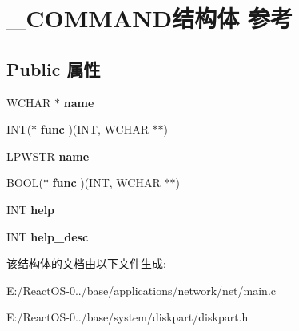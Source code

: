 \hypertarget{struct___c_o_m_m_a_n_d}{}\section{\+\_\+\+C\+O\+M\+M\+A\+N\+D结构体 参考}
\label{struct___c_o_m_m_a_n_d}
\subsection*{Public 属性}
\begin{DoxyCompactItemize}
\item 
\mbox{\label{struct___c_o_m_m_a_n_d_a55d755309c3ec8e34ad5a07dec08bf1c}} 
W\+C\+H\+AR $\ast$ {\bfseries name}
\item 
\mbox{\label{struct___c_o_m_m_a_n_d_a79fbb5a11689ec3cfbdda73522455f4d}} 
I\+NT($\ast$ {\bfseries func} )(I\+NT, W\+C\+H\+AR $\ast$$\ast$)
\item 
\mbox{\label{struct___c_o_m_m_a_n_d_a8540cf847ed07445172a09411f7165b2}} 
L\+P\+W\+S\+TR {\bfseries name}
\item 
\mbox{\label{struct___c_o_m_m_a_n_d_a33c89a07deb7afdcc5748e9ed9181ee5}} 
B\+O\+OL($\ast$ {\bfseries func} )(I\+NT, W\+C\+H\+AR $\ast$$\ast$)
\item 
\mbox{\label{struct___c_o_m_m_a_n_d_a2d6dab6557ee0da67b70c932f9817ef2}} 
I\+NT {\bfseries help}
\item 
\mbox{\label{struct___c_o_m_m_a_n_d_a76a2b8738e53ff1099d2cdc118cde2a8}} 
I\+NT {\bfseries help\+\_\+desc}
\end{DoxyCompactItemize}


该结构体的文档由以下文件生成\+:\begin{DoxyCompactItemize}
\item 
E\+:/\+React\+O\+S-\/0../base/applications/network/net/main.\+c\item 
E\+:/\+React\+O\+S-\/0../base/system/diskpart/diskpart.\+h\end{DoxyCompactItemize}
